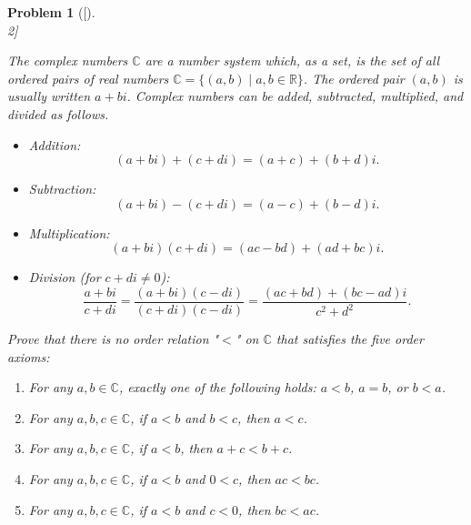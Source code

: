 \documentclass[12pt]{article}
\newtheorem{problemx}{Problem}
\newenvironment{problem}[1]{%
	\begin{problemx}[#1]\leavevmode\\[0.5em] %
	}{%
	\end{problemx}
}
\begin{document}
	\begin{problem}[2]
		
		The complex numbers $\mathbb{C}$ are a number system which, as a set, is the set of all ordered pairs of real numbers $\mathbb{C} = \{(a,b) \mid a,b \in \mathbb{R}\}$. The ordered pair $(a,b)$ is usually written $a + bi$. Complex numbers can be added, subtracted, multiplied, and divided as follows.
		
		\begin{itemize}[leftmargin=*]
			\item Addition:
			\[
			(a + bi) + (c + di) = (a+c) + (b+d)i.
			\]
			\item Subtraction:
			\[
			(a + bi) - (c + di) = (a-c) + (b-d)i.
			\]
			\item Multiplication:
			\[
			(a + bi)(c + di) = (ac - bd) + (ad + bc)i.
			\]
			\item Division (for $c + di \neq 0$):
			\[
			\frac{a + bi}{c + di} = \frac{(a + bi)(c - di)}{(c + di)(c - di)} = \frac{(ac + bd) + (bc - ad)i}{c^2 + d^2}.
			\]
		\end{itemize}
		
		Prove that there is no order relation "$<$" on $\mathbb{C}$ that satisfies the five order axioms:
		
		\begin{enumerate}[leftmargin=*]
			\item For any $a,b \in \mathbb{C}$, exactly one of the following holds: $a < b$, $a = b$, or $b < a$.
			\item For any $a,b,c \in \mathbb{C}$, if $a < b$ and $b < c$, then $a < c$.
			\item For any $a,b,c \in \mathbb{C}$, if $a < b$, then $a + c < b + c$.
			\item For any $a,b,c \in \mathbb{C}$, if $a < b$ and $0 < c$, then $ac < bc$.
			\item For any $a,b,c \in \mathbb{C}$, if $a < b$ and $c < 0$, then $bc < ac$.
		\end{enumerate}
		
	\end{problem}
	
\end{document}
